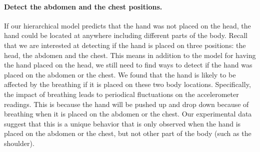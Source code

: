 
\paragraph{Detect the abdomen and the chest positions.}

If our hierarchical model predicts that the hand was not placed on the head, the hand could be located at anywhere including different
parts of the body. Recall that we are interested at detecting if the hand is placed on three positions: the head, the abdomen and the
chest. This means in addition to the model for having the hand placed on the head, we still need to find ways to detect if the hand was placed on the abdomen or the
chest. We found that the hand is likely to be affected by the breathing if it is placed on these two body locations. Specifically, the
 impact of breathing leads to periodical fluctuations on the accelerometer readings. This is because the hand will be pushed up and drop down because of
breathing when it is placed on the abdomen or the chest. Our experimental data suggest that this is a unique behavior that is only observed
when the hand is placed on the abdomen or the chest, but not other part of the body (such as the shoulder).



